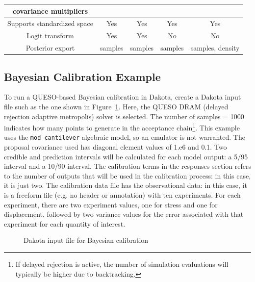\begin{table}
\begin{tabular}{|c|c|c|c|c|}
covariance multipliers         &                 &                 &                        &              \\
\hline
Supports standardized space    &  Yes            & Yes             & Yes                    & Yes           \\             
\hline
Logit transform                &  Yes            & Yes             &  No                    & No            \\             
\hline
Posterior export               &  samples        & samples         &  samples               & samples, density \\             
\hline
\end{tabular}
\end{table}


\subsection{Bayesian Calibration Example}\label{uq:bayesian:ex}

To run a QUESO-based Bayesian calibration in Dakota, create a Dakota
input file such as the one shown in Figure~\ref{uq:figure18}.  Here,
the QUESO DRAM (delayed rejection adaptive metropolis) solver is
selected. The number of samples = 1000 indicates how many points to
generate in the acceptance chain\footnote{If delayed rejection is
  active, the number of simulation evaluations will typically be
  higher due to backtracking.}.  This example uses the
\texttt{mod\_cantilever} algebraic model, so an emulator is not
warranted.  The proposal covariance used has diagonal element values
of 1.e6 and 0.1. Two credible and prediction intervals will be
calculated for each model output: a 5/95 interval and a 10/90
interval. The calibration terms in the responses section refers to the
number of outputs that will be used in the calibration process: in
this case, it is just two. The calibration data file has the
observational data: in this case, it is a freeform file (e.g. no
header or annotation) with ten experiments. For each experiment, there
are two experiment values, one for stress and one for displacement,
followed by two variance values for the error associated with that
experiment for each quantity of interest.

\begin{figure}[htbp!]
  \centering
  \begin{bigbox}
    \begin{small}
    \end{small}
  \end{bigbox}
  \caption{Dakota input file for Bayesian calibration}
\label{uq:figure18}
\end{figure}

